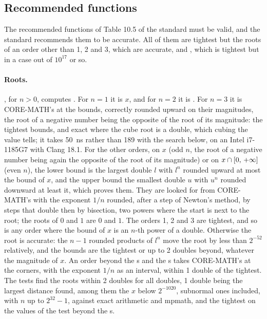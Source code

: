\documentclass[12pt,a4paper,twoside,openright]{book}
\begin{document}
\subsection{Recommended functions}\label{sec:accuracy-recommended}

The recommended functions of Table 10.5 of the standard must be valid, and
the standard recommends them to be accurate. All of them are tightest but
the roots of an order other than 1, 2 and 3, which are accurate, and
, which is tightest but in a case out of $10^{17}$ or so.

\paragraph{Roots.}%
, for $n>0$, computes . For $n=1$ it is
$x$, and for $n=2$ it is . For $n=3$ it is CORE-MATH's
 at the bounds, correctly rounded upward on their magnitudes,
the root of a negative number being the opposite of the root of its
magnitude: the tightest bounds, and exact where the cube root is a double,
which cubing the value tells; it takes 50~ns rather than 189 with the
search below, on an Intel i7-1185G7 with Clang 18.1.\newinvfive{} For the
other orders, on $x$ (odd $n$, the root of a negative number being again
the opposite of the root of its magnitude) or on $x\cap[0,\,+\infty]$
(even $n$), the lower bound is the largest double $l$ with $l^n$ rounded
upward at most the bound of $x$, and the upper bound the smallest double
$u$ with $u^n$ rounded downward at least it, which proves them. They are
looked for from CORE-MATH's  with the exponent $1/n$ rounded,
after a step of Newton's method, by steps that double then by bisection,
two powers where the start is next to the root; the roots of $0$ and $1$
are $0$ and $1$. The orders 1, 2 and 3 are tightest, and so is any order
where the bound of $x$ is an $n$-th power of a double. Otherwise the root
is accurate: the $n-1$ rounded products of $l^n$ move the root by less than
$2^{-52}$ relatively, and the bounds are the tightest or up to 2 doubles
beyond, whatever the magnitude of $x$. An order beyond the s and
the s takes CORE-MATH's  at the corners, with
the exponent $1/n$ as an interval, within 1 double of the
tightest.\newinvfive{} The tests find the roots within 2 doubles for all
doubles, 1 double being the largest distance found, among them the $x$
below $2^{-1020}$, subnormal ones included, with $n$ up to $2^{32}-1$,
against exact arithmetic and mpmath, and the tightest on the values of the
test  beyond the s.
\end{document}
